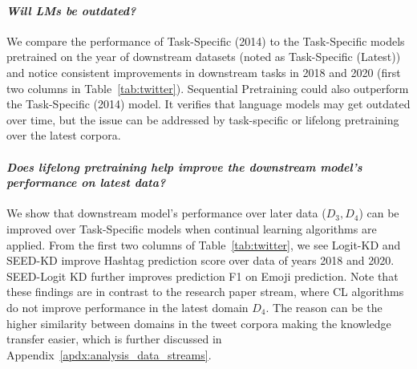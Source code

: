 \paragraph{\textit{Will LMs be outdated?}} %
We compare the performance of Task-Specific (2014) to the Task-Specific models pretrained on the year of downstream datasets (noted as Task-Specific (Latest)) and notice consistent improvements in downstream tasks in 2018 and 2020  (first two columns in Table~\ref{tab:twitter}). Sequential Pretraining could also outperform the Task-Specific (2014) model. It verifies that language models may get outdated over time, but the issue can be addressed by task-specific or lifelong pretraining over the latest corpora.





\paragraph{\textit{Does lifelong pretraining help improve the downstream model’s performance on latest data?}}
We show that downstream model's performance over later data ($D_3, D_4$) can be improved over Task-Specific models when continual learning algorithms are applied. From the first two columns of Table~\ref{tab:twitter}, %
we see Logit-KD and SEED-KD improve Hashtag prediction score over data of years 2018 and 2020. %
SEED-Logit KD further improves prediction F1 on Emoji prediction. 
Note that these findings are in contrast to the research paper stream, where CL algorithms do not improve performance in the latest domain $D_4$. The reason can be the higher similarity between domains in the tweet corpora making the knowledge transfer easier, which is further discussed in Appendix~\ref{apdx:analysis_data_streams}.

